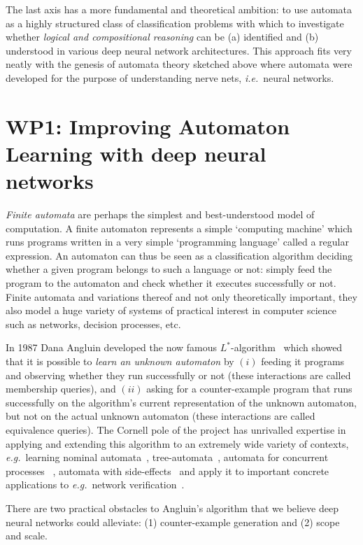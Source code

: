 \documentclass[11pt,a4paper]{article}
\newcommand{\ie}{\textit{i.e.}\ }
\newcommand{\eg}{\textit{e.g.}\ }
\newcommand{\Ls}{$L^\ast$\xspace}
\begin{document}
		The last axis has a more fundamental and theoretical ambition: to use automata as a highly structured class of classification problems with which to investigate whether \emph{logical and compositional reasoning} can be (a) identified and (b) understood in various deep neural network architectures. This approach fits very neatly with the genesis of automata theory sketched above where automata were developed for the purpose of understanding nerve nets, \ie neural networks.
	
	\section*{WP1: Improving Automaton Learning with deep neural networks}
		\emph{Finite automata} are perhaps the simplest and best-understood model of computation. A finite automaton represents a simple `computing machine' which runs programs written in a very simple `programming language' called a regular expression. An automaton can thus be seen as a classification algorithm deciding whether a given program belongs to such a language or not: simply feed the program to the automaton and check whether it executes successfully or not. Finite automata and variations thereof and not only theoretically important, they also model a huge variety of systems of practical interest in computer science such as networks, decision processes, etc.
		
		In 1987 Dana Angluin developed the now famous \Ls-algorithm~\cite{angluin1987learning} which showed that it is possible to \emph{learn an unknown automaton} by $(i)$ feeding it programs and observing whether they run successfully or not (these interactions are called membership queries), and $(ii)$ asking for a counter-example program that runs successfully on the algorithm's current representation of the unknown automaton, but not on the actual unknown automaton (these interactions are called equivalence queries).  The Cornell pole of the project has unrivalled expertise in applying and extending this algorithm to an extremely wide variety of contexts, \eg learning nominal automata~\cite{moerman2017learning}, tree-automata~\cite{heerdt2022categorical}, automata for concurrent processes ~\cite{van2021learning}, automata with side-effects~\cite{van2020learning} and apply it to important concrete applications to \eg network verification~\cite{ferreira2021prognosis}.
		  
		There are two practical obstacles to Angluin's algorithm that we believe deep neural networks could alleviate: (1) counter-example generation and (2) scope and scale.
		\setcounter{section}{1}
		\setcounter{subsection}{0}
\end{document}
